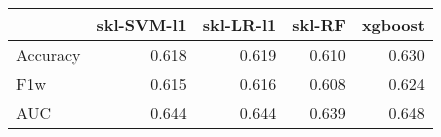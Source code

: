 \begin{tabular}{lrrrr}
\toprule
{} &  skl-SVM-l1 &  skl-LR-l1 &  skl-RF &  xgboost \\
\midrule
Accuracy &       0.618 &      0.619 &   0.610 &    0.630 \\
F1w      &       0.615 &      0.616 &   0.608 &    0.624 \\
AUC      &       0.644 &      0.644 &   0.639 &    0.648 \\
\bottomrule
\end{tabular}
